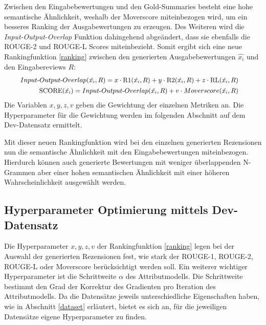Zwischen den Eingabebewertungen und den Gold-Summaries besteht eine hohe semantische Ähnlichkeit, weshalb der Moverscore miteinbezogen wird, um ein besseres Ranking der Ausgabewertungen zu erzeugen.
Des Weiteren wird die \textit{Input-Output-Overlap} Funktion dahingehend abgeändert, dass sie ebenfalls die ROUGE-2 und ROUGE-L Scores miteinbezieht.
Somit ergibt sich eine neue Rankingfunktion \ref{ranking} zwischen den generierten Ausgabebewertungen $\hat{x_i}$ und den Eingabereviews $R$:
\begin{align}
    \small
    \begin{split}
    Input\text{-}Output\text{-}Overlap(\hat{x_i}, R) &= x \cdot \text{R1}(\hat{x_i}, R)+y\cdot \text{R2}(\hat{x_i}, R)+z\cdot \text{RL}(\hat{x_i}, R)  \label{ranking}
\end{split}\\
\small
\begin{split}
    \text{SCORE}(\hat{x_i}) &= Input\text{-}Output\text{-}Overlap(\hat{x_i}, R) + v \cdot Moverscore(\hat{x_i}, R) 
\end{split}
\end{align}
Die Variablen $x,y,z,v$ geben die Gewichtung der einzelnen Metriken an. 
Die Hyperparameter für die Gewichtung werden im folgenden Abschnitt auf dem Dev-Datensatz ermittelt.

Mit dieser neuen Rankingfunktion wird bei den einzelnen generierten Rezensionen nun die semantische Ähnlichkeit mit den Eingabebewertungen miteinbezogen. 
Hierdurch können auch generierte Bewertungen mit weniger überlappenden N-Grammen aber einer hohen semantischen Ähnlichkeit mit einer höheren Wahrscheinlichkeit ausgewählt werden.

\pagebreak
\subsection{Hyperparameter Optimierung mittels Dev-Datensatz}
\label{eval_pplm}
Die Hyperparameter $x,y,z,v$ der Rankingfunktion \ref{ranking} legen bei der Auswahl der generierten Rezensionen fest, wie stark der ROUGE-1, ROUGE-2, ROUGE-L oder Moverscore berücksichtigt werden soll.
Ein weiterer wichtiger Hyperparameter ist die Schrittweite $\alpha$ des Attributmodells. Die Schrittweite bestimmt den Grad der Korrektur des Gradienten pro Iteration des Attributmodells. 
Da die Datensätze jeweils unterschiedliche Eigenschaften haben, wie in Abschnitt \ref{dataset} erläutert, bietet es sich an, für die jeweiligen Datensätze eigene Hyperparameter zu finden.

